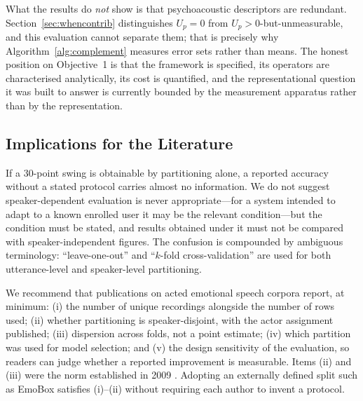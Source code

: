 \documentclass[journal,onecolumn,11pt,draftclsnofoot]{IEEEtran}   %
\begin{document}
What the results do \emph{not} show is that psychoacoustic descriptors are
redundant. Section~\ref{sec:whencontrib} distinguishes $U_p = 0$ from
$U_p > 0$-but-unmeasurable, and this evaluation cannot separate them; that is
precisely why Algorithm~\ref{alg:complement} measures error sets rather than
means. The honest position on Objective~1 is that the framework is specified,
its operators are characterised analytically, its cost is quantified, and the
representational question it was built to answer is currently bounded by the
measurement apparatus rather than by the representation.

\subsection{Implications for the Literature}
\label{sec:recommendations}
If a 30-point swing is obtainable by partitioning alone, a reported accuracy
without a stated protocol carries almost no information. We do not suggest
speaker-dependent evaluation is never appropriate---for a system intended to
adapt to a known enrolled user it may be the relevant condition---but the
condition must be stated, and results obtained under it must not be compared
with speaker-independent figures. The confusion is compounded by ambiguous
terminology: ``leave-one-out'' and ``$k$-fold cross-validation'' are used for
both utterance-level and speaker-level partitioning.

We recommend that publications on acted emotional speech corpora report, at
minimum: (i) the number of unique recordings alongside the number of rows used;
(ii) whether partitioning is speaker-disjoint, with the actor assignment
published; (iii) dispersion across folds, not a point estimate; (iv) which
partition was used for model selection; and (v) the design sensitivity of the
evaluation, so readers can judge whether a reported improvement is measurable.
Items (ii) and (iii) were the norm established in 2009
\cite{schuller2009challenge}. Adopting an externally defined split such as
EmoBox \cite{ma2024emobox} satisfies (i)--(ii) without requiring each author to
invent a protocol.
\end{document}
